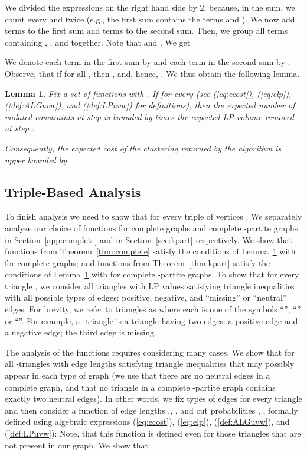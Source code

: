 \documentclass[11pt]{article}
\newtheorem{lemma}[theorem]{Lemma}
\theoremstyle{definition}
\theoremstyle{remark}
\begin{document}
We divided the expressions on the right hand side by 2, because, in the sum, we
count every  and  twice (e.g., the first sum
contains the terms  and ).  We now add terms
 to the first sum and terms  to the second sum.
Then, we group all terms containing , , and  together. Note that
 and . We get

We denote each term in the first sum by  and each term in the second
sum by . Observe, that if 
for all , then
, and, hence,
. We thus obtain the following lemma.

\begin{lemma}\label{lem:alpha}
Fix a set of functions  with .  If  for every  (see
(\ref{eq:ecost}), (\ref{eq:elp}), (\ref{def:ALGuvw}), and (\ref{def:LPuvw}) for
definitions), then the expected number of violated constraints at step  is
bounded by  times the expected LP volume removed at step :

Consequently, the expected cost of the clustering returned by the algorithm is
upper bounded by .
\end{lemma}


\subsection{Triple-Based Analysis}

\label{sec:performing_analysis}
To finish analysis we need to show that  for every
triple of vertices . We separately analyze our choice of functions
 for complete graphs and complete -partite graphs in
Section~\ref{app:complete} and in Section~\ref{sec:kpart} respectively.  We
show that functions from Theorem~\ref{thm:complete} satisfy the conditions of
Lemma~\ref{lem:alpha} with  for complete graphs; and functions
from Theorem~\ref{thm:kpart} satisfy the conditions of Lemma~\ref{lem:alpha}
with  for complete -partite graphs. To show that  for every triangle , we consider all triangles 
with LP values satisfying triangle inequalities with all possible types of
edges: positive, negative, and ``missing'' or ``neutral'' edges. For brevity,
we refer to triangles as  where each  is one of the
symbols ``'', ``'' or ``''.  For example, a
-triangle is a triangle having two edges: a positive edge
and a negative edge; the third edge is missing.

The analysis of the functions  requires considering many cases. We
show that  for all
-triangles with edge lengths  satisfying
triangle inequalities that may possibly appear in each type of graph
(we use that there are no neutral edges in a complete graph, and that
no triangle in a complete -partite graph contains exactly two
neutral edges).  In other words, we fix types of edges for every
triangle and then consider a function of edge lengths
,, , and cut probabilities , ,
 formally defined using algebraic expressions
(\ref{eq:ecost}), (\ref{eq:elp}), (\ref{def:ALGuvw}), and
(\ref{def:LPuvw}):  Note, that this
function is defined even for those triangles that are not present in
our graph. We show that
\end{document}
